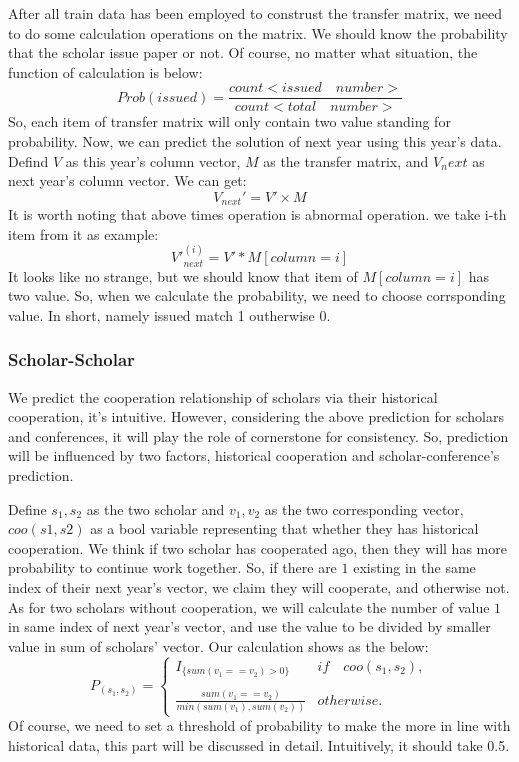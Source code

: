 \documentclass[conference]{IEEEtran}
\begin{document}
After all train data has been employed to construst the transfer matrix, we need to do some calculation operations on the matrix. We should know the probability that the scholar issue paper or not. Of course, no matter what situation, the function of calculation is below:
\[ Prob(issued) = \frac{count<issued\quad number>}{count<total\quad number>} \]
So, each item of transfer matrix will only contain two value standing for probability.
Now, we can predict the solution of next year using this year's data. Defind $V$ as this year's column vector, $M$ as the transfer matrix, and $V_next$ as next year's column vector. We can get:
\[V_{next}' = V' \times M\]
It is worth noting that above times operation is abnormal operation. we take i-th item from it as example:
\[V'^{(i)}_{next} = V' * M[column=i]\]
It looks like no strange, but we should know that item of $M[column=i]$ has two value. So, when we calculate the probability, we need to choose corrsponding value. In short, namely issued match 1 outherwise 0.
\subsubsection{Scholar-Scholar}
We predict the cooperation relationship of scholars via their historical cooperation, it's intuitive. However, considering the above prediction for scholars and conferences, it will play the role of cornerstone for consistency. So, prediction will be influenced by two factors, historical cooperation and scholar-conference's prediction. 

Define $s_1, s_2$ as the two scholar and $v_1, v_2$ as the two corresponding vector, $coo(s1, s2)$ as a bool variable representing that whether they has historical cooperation. We think if two scholar has cooperated ago, then they will has more probability to continue work together. So, if there are $1$ existing in the same index of their next year's vector, we claim they will cooperate, and otherwise not. As for two scholars without cooperation, we will calculate the number of value $1$ in same index of next year's vector, and use the value to be divided by smaller value in sum of scholars' vector. Our calculation shows as the below:
\[P_{(s_1,s_2)}=\left\{\begin{array}{ll}
I_{\{sum(v_1 == v_2) > 0\}}&\text{$if\quad  coo(s_1, s_2)$},\\\\
\frac{sum(v_1==v_2)}{min(sum(v_1), sum(v_2))}& otherwise.
\end{array}\right.\]
Of course, we need to set a threshold of probability to make the more in line with historical data, this part will be discussed in detail. Intuitively, it should take 0.5.
\end{document}

